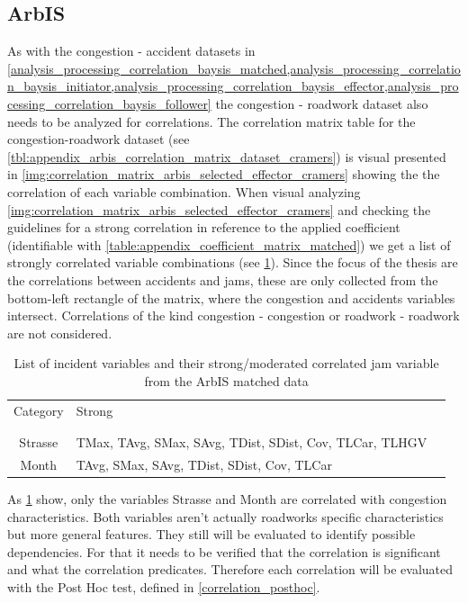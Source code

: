 \subsection{ArbIS}
\label{analysis_processing_correlation_arbis_matched}
As with the congestion - accident datasets in \cref{analysis_processing_correlation_baysis_matched,analysis_processing_correlation_baysis_initiator,analysis_processing_correlation_baysis_effector,analysis_processing_correlation_baysis_follower} the congestion - roadwork dataset also needs to be analyzed for correlations. The correlation matrix table for the congestion-roadwork dataset (see \cref{tbl:appendix_arbis_correlation_matrix_dataset_cramers}) is visual presented in \cref{img:correlation_matrix_arbis_selected_effector_cramers} showing the the correlation of each variable combination. When visual analyzing \cref{img:correlation_matrix_arbis_selected_effector_cramers} and checking the guidelines for a strong correlation in reference to the applied coefficient (identifiable with \cref{table:appendix_coefficient_matrix_matched}) we get a list of strongly correlated variable combinations (see \cref{tbl:correlation_list_arbis_matched}). Since the focus of the thesis are the correlations between accidents and jams, these are only collected from the bottom-left rectangle of the matrix, where the congestion and accidents variables intersect. Correlations of the kind congestion - congestion or roadwork - roadwork are not considered.
\begin{table}[h!]
	\centering
	\begin{tabular}{c|l|l}  
		Category & Strong \\
		\\[-1em]
		\hline
		\\[-1em]
		Strasse & TMax, TAvg, SMax, SAvg, TDist, SDist, Cov, TLCar, TLHGV \\ 
 		Month & TAvg, SMax, SAvg, TDist, SDist, Cov, TLCar \\
	\end{tabular}
  \caption{List of incident variables and their strong/moderated correlated jam variable from the ArbIS matched data}
  \label{tbl:correlation_list_arbis_matched}
\end{table}
As \cref{tbl:correlation_list_arbis_matched} show, only the variables Strasse and Month are correlated with congestion characteristics. Both variables aren't actually roadworks specific characteristics but more general features. They still will be evaluated to identify possible dependencies. For that it needs to be verified that the correlation is significant and what the correlation predicates. Therefore each correlation will be evaluated with the Post Hoc test, defined in \cref{correlation_posthoc}. 
